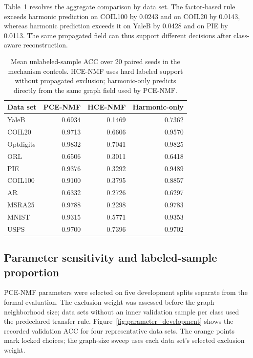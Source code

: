 \documentclass[preprint,12pt]{elsarticle}
\theoremstyle{remark}
\begin{document}
Table~\ref{tab:mechanism_acc} resolves the aggregate comparison by
data set. The factor-based rule exceeds harmonic prediction on COIL100
by 0.0243 and on COIL20 by 0.0143, whereas harmonic prediction exceeds
it on YaleB by 0.0428 and on PIE by 0.0113. The same propagated field
can thus support different decisions after class-aware reconstruction.

\begin{table}[!htbp]
\centering
\caption{Mean unlabeled-sample ACC over 20 paired seeds in the
mechanism controls. HCE-NMF uses hard labeled support without
propagated exclusion; harmonic-only predicts directly from the same
graph field used by PCE-NMF.}
\label{tab:mechanism_acc}
\small
\begin{tabular}{lrrr}
\toprule
Data set & PCE-NMF & HCE-NMF & Harmonic-only \\
\midrule
YaleB     & 0.6934 & 0.1469 & 0.7362 \\
COIL20    & 0.9713 & 0.6606 & 0.9570 \\
Optdigits & 0.9832 & 0.7041 & 0.9825 \\
ORL       & 0.6506 & 0.3011 & 0.6418 \\
PIE       & 0.9376 & 0.3292 & 0.9489 \\
COIL100   & 0.9100 & 0.3795 & 0.8857 \\
AR        & 0.6332 & 0.2726 & 0.6297 \\
MSRA25    & 0.9788 & 0.2298 & 0.9783 \\
MNIST     & 0.9315 & 0.5771 & 0.9353 \\
USPS      & 0.9700 & 0.7396 & 0.9702 \\
\bottomrule
\end{tabular}
\end{table}

\subsection{Parameter sensitivity and labeled-sample proportion}

PCE-NMF parameters were selected on five development splits separate
from the formal evaluation. The exclusion weight was assessed before the
graph-neighborhood size; data sets without an inner validation sample
per class used the predeclared transfer rule. Figure~\ref{fig:parameter_development}
shows the recorded validation ACC for four representative data sets.
The orange points mark locked choices; the graph-size sweep uses each
data set's selected exclusion weight.
\end{document}

